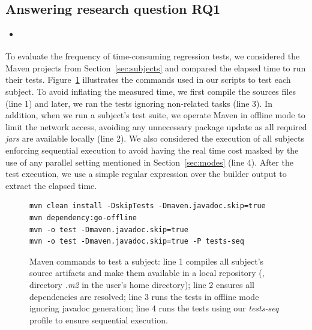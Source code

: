 \subsection{Answering research question RQ1}
\label{sec:rqone}

\begin{itemize}
    \item \emph{\RQA}
\end{itemize}

To evaluate the frequency of time-consuming regression tests, we
considered the  Maven projects from Section~\ref{sec:subjects}
and compared the elapsed time to run their tests.
Figure~\ref{fig:mvn-execution} illustrates the commands used in our
scripts to test each subject.  To avoid inflating the measured time,
we first compile the sources files (line 1) and later, we ran the
tests ignoring non-related tasks (line 3).  In addition, when we run a
subject's test suite, we operate Maven in offline mode to limit the
network access, avoiding any unnecessary package update as all
required \emph{jars} are available locally (line 2). We also
considered the execution of all subjects enforcing sequential
execution to avoid having the real time cost masked by the use of any
parallel setting mentioned in Section~\ref{sec:modes} (line 4).  After
the test execution, we use a simple regular expression over the
builder output to extract the elapsed time.

\begin{figure}[h!]
\centering
\scriptsize
{}
\begin{lstlisting}
mvn clean install -DskipTests -Dmaven.javadoc.skip=true
mvn dependency:go-offline
mvn -o test -Dmaven.javadoc.skip=true
mvn -o test -Dmaven.javadoc.skip=true -P tests-seq
\end{lstlisting}
\caption{\label{fig:mvn-execution} Maven commands to test a subject:
    line 1 compiles all subject's source artifacts and make them
    available in a local repository (\ie, directory \emph{.m2} in the
    user's home directory); line 2 ensures all dependencies are
    resolved; line 3 runs the tests in offline mode ignoring javadoc
    generation; line 4 runs the tests using our \emph{tests-seq}
    profile to ensure sequential execution.}
\end{figure}

